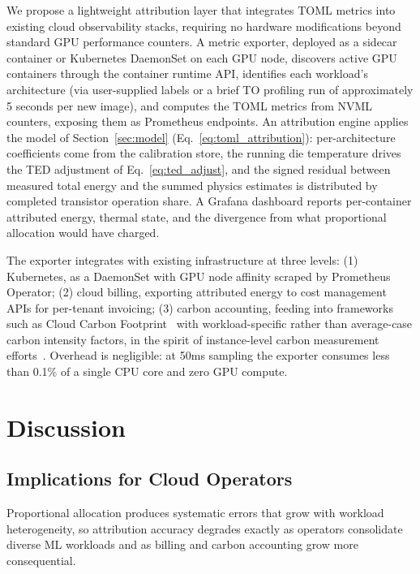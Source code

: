 \documentclass[conference]{IEEEtran}
\begin{document}
We propose a lightweight attribution layer that integrates TOML metrics into existing cloud observability stacks, requiring no hardware modifications beyond standard GPU performance counters. A metric exporter, deployed as a sidecar container or Kubernetes DaemonSet on each GPU node, discovers active GPU containers through the container runtime API, identifies each workload's architecture (via user-supplied labels or a brief TO profiling run of approximately 5 seconds per new image), and computes the TOML metrics from NVML counters, exposing them as Prometheus endpoints. An attribution engine applies the model of Section~\ref{sec:model} (Eq.~\ref{eq:toml_attribution}): per-architecture coefficients come from the calibration store, the running die temperature drives the TED adjustment of Eq.~\ref{eq:ted_adjust}, and the signed residual between measured total energy and the summed physics estimates is distributed by completed transistor operation share. A Grafana dashboard reports per-container attributed energy, thermal state, and the divergence from what proportional allocation would have charged.

The exporter integrates with existing infrastructure at three levels: (1) Kubernetes, as a DaemonSet with GPU node affinity scraped by Prometheus Operator; (2) cloud billing, exporting attributed energy to cost management APIs for per-tenant invoicing; (3) carbon accounting, feeding into frameworks such as Cloud Carbon Footprint~\cite{ccf2026} with workload-specific rather than average-case carbon intensity factors, in the spirit of instance-level carbon measurement efforts~\cite{dodge2022measuring}. Overhead is negligible: at 50ms sampling the exporter consumes less than 0.1\% of a single CPU core and zero GPU compute.


\section{Discussion}
\label{sec:discussion}

\subsection{Implications for Cloud Operators}

Proportional allocation produces systematic errors that grow with workload heterogeneity, so attribution accuracy degrades exactly as operators consolidate diverse ML workloads and as billing and carbon accounting grow more consequential.
\end{document}
